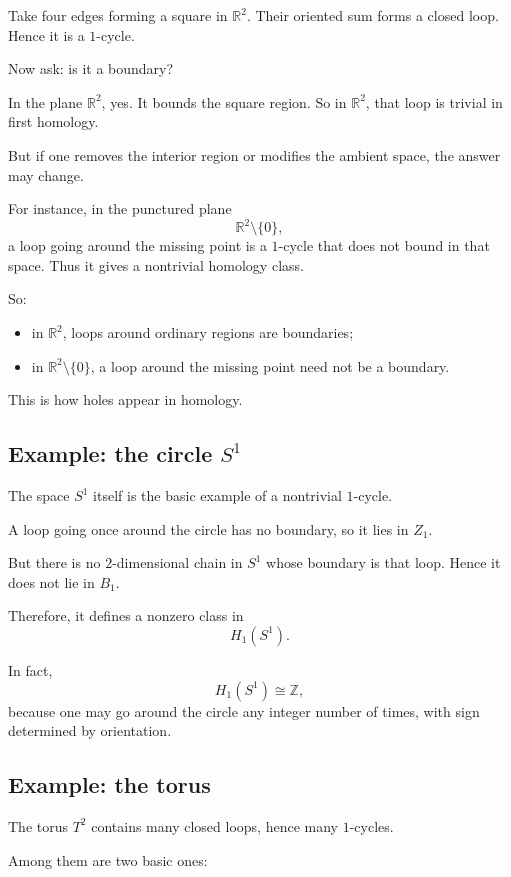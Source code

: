 \documentclass[12pt,a4paper]{article}
\theoremstyle{notespace}
\begin{document}
Take four edges forming a square in \(\mathbb R^2\). Their oriented sum forms a closed loop. Hence it is a \(1\)-cycle.

Now ask: is it a boundary?

In the plane \(\mathbb R^2\), yes. It bounds the square region. So in \(\mathbb R^2\), that loop is trivial in first homology.

But if one removes the interior region or modifies the ambient space, the answer may change.

For instance, in the punctured plane
\[
\mathbb R^2\setminus \{0\},
\]
a loop going around the missing point is a \(1\)-cycle that does not bound in that space. Thus it gives a nontrivial homology class.

So:

\begin{itemize}
	\item in \(\mathbb R^2\), loops around ordinary regions are boundaries;
	\item in \(\mathbb R^2\setminus \{0\}\), a loop around the missing point need not be a boundary.
\end{itemize}

This is how holes appear in homology.

\subsection{ Example: the circle \texorpdfstring{$S^1$}{S1}}

The space \(S^1\) itself is the basic example of a nontrivial \(1\)-cycle.

A loop going once around the circle has no boundary, so it lies in \(Z_1\).

But there is no \(2\)-dimensional chain in \(S^1\) whose boundary is that loop. Hence it does not lie in \(B_1\).

Therefore, it defines a nonzero class in
\[
H_1(S^1).
\]

In fact,
\[
H_1(S^1)\cong \mathbb Z,
\]
because one may go around the circle any integer number of times, with sign determined by orientation.

\subsection{ Example: the torus}

The torus \(T^2\) contains many closed loops, hence many \(1\)-cycles.

Among them are two basic ones:
\end{document}
